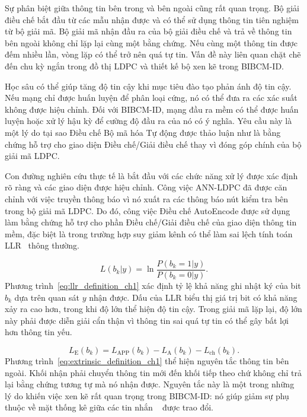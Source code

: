 Sự phân biệt giữa thông tin bên trong và bên ngoài cũng rất quan trọng. Bộ giải điều chế bắt đầu từ các mẫu nhận được và có thể sử dụng thông tin tiên nghiệm từ bộ giải mã. Bộ giải mã nhận đầu ra của bộ giải điều chế và trả về thông tin bên ngoài không chỉ lặp lại cùng một bằng chứng. Nếu cùng một thông tin được đếm nhiều lần, vòng lặp có thể trở nên quá tự tin. Vấn đề này liên quan chặt chẽ đến chu kỳ ngắn trong đồ thị LDPC và thiết kế bộ xen kẽ trong BIBCM-ID.

Học sâu có thể giúp tăng độ tin cậy khi mục tiêu đào tạo phản ánh độ tin cậy. Nếu mạng chỉ được huấn luyện để phân loại cứng, nó có thể đưa ra các xác suất không được hiệu chỉnh. Đối với BIBCM-ID, mạng đầu ra mềm có thể được huấn luyện hoặc xử lý hậu kỳ để cường độ đầu ra của nó có ý nghĩa. Yêu cầu này là một lý do tại sao Điều chế Bộ mã hóa Tự động được thảo luận như là bằng chứng hỗ trợ cho giao diện Điều chế/Giải điều chế thay vì đóng góp chính của bộ giải mã LDPC.

Con đường nghiên cứu thực tế là bắt đầu với các chức năng xử lý được xác định rõ ràng và các giao diện được hiệu chỉnh. Công việc ANN-LDPC đã được căn chỉnh với việc truyền thông báo vì nó xuất ra các thông báo nút kiểm tra bên trong bộ giải mã LDPC. Do đó, công việc Điều chế AutoEncode được sử dụng làm bằng chứng hỗ trợ cho phần Điều chế/Giải điều chế của giao diện thông tin mềm, đặc biệt là trong trường hợp suy giảm kênh có thể làm sai lệch tính toán LLR~ thông thường.

\begin{equation}
\label{eq:llr_definition_ch1}
L(b_k|y)=\ln\frac{P(b_k=1|y)}{P(b_k=0|y)}.
\end{equation}
Phương trình~\eqref{eq:llr_definition_ch1} xác định tỷ lệ khả năng ghi nhật ký của bit $b_k$ dựa trên quan sát $y$ nhận được. Dấu của LLR biểu thị giá trị bit có khả năng xảy ra cao hơn, trong khi độ lớn thể hiện độ tin cậy. Trong giải mã lặp lại, độ lớn này phải được diễn giải cẩn thận vì thông tin sai quá tự tin có thể gây bất lợi hơn thông tin yếu.

\begin{equation}
\label{eq:extrinsic_definition_ch1}
L_{\mathrm{E}}(b_k)=L_{\mathrm{APP}}(b_k)-L_{\mathrm{A}}(b_k)-L_{\mathrm{ch}}(b_k).
\end{equation}
Phương trình~\eqref{eq:extrinsic_definition_ch1} thể hiện nguyên tắc thông tin bên ngoài. Khối nhận phải chuyển thông tin mới đến khối tiếp theo chứ không chỉ trả lại bằng chứng tương tự mà nó nhận được. Nguyên tắc này là một trong những lý do khiến việc xen kẽ rất quan trọng trong BIBCM-ID: nó giúp giảm sự phụ thuộc về mặt thống kê giữa các tin nhắn ~ được trao đổi.

